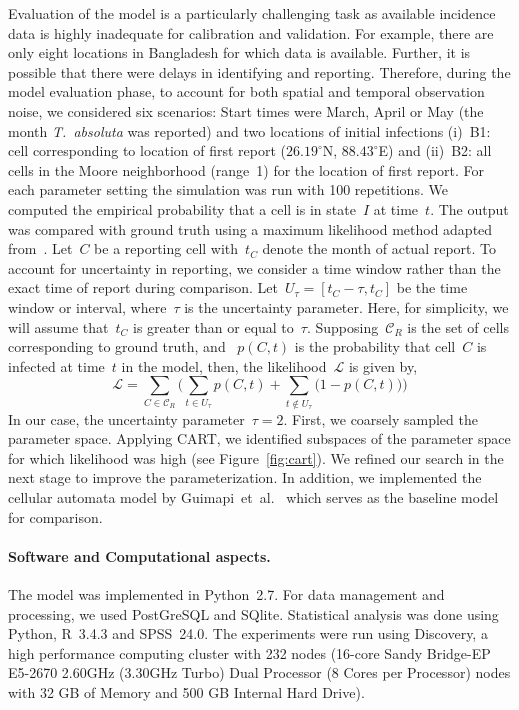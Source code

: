 \documentclass[11pt]{article}
\newcommand{\tuta}{\emph{T.~absoluta}}
\newcommand{\reportingCells}{\mathcal{C}_R}
\newcommand{\likelihood}{\mathcal{L}}
\theoremstyle{definition}
\begin{document}
Evaluation of the model is a particularly challenging task as available
incidence data is highly inadequate for calibration and validation. For
example, there are only eight locations in Bangladesh for which data is
available. Further, it is possible that there were delays in identifying
and reporting.  Therefore, during the model evaluation phase, to account
for both spatial and temporal observation noise, we considered six
scenarios: Start times were March, April or May (the month \tuta{} was
reported) and two locations of initial infections (i)~B1: cell
corresponding to location of first report ($26.19^\circ$N, $88.43^\circ$E)
and (ii)~B2: all cells in the Moore neighborhood (range~1) for the location
of first report.  For each parameter setting the simulation was run with
100 repetitions.  We computed the empirical probability that a cell is in
state~$I$ at time~$t$.  The output was compared with ground truth using a
maximum likelihood method adapted
from~\cite{carrasco2010unveiling,keeling}. Let~$C$ be a reporting cell
with~$t_C$ denote the month of actual report. To account for uncertainty in
reporting, we consider a time window rather than the exact time of report
during comparison. Let~$U_\tau=[t_C-\tau,t_C]$ be the time window or
interval, where~$\tau$ is the uncertainty parameter. Here, for simplicity,
we will assume that~$t_C$ is greater than or equal to~$\tau$.
Supposing~$\reportingCells$ is the set of cells corresponding to ground
truth,  and ~$p(C,t)$ is the probability that cell~$C$ is infected at
time~$t$ in the model, then, the likelihood~$\likelihood$ is given by,
\[
    \likelihood=\sum_{C\in\reportingCells} \Big(\sum_{t\in U_\tau}p(C,t)
    + \sum_{t\notin U_\tau}\big(1-p(C,t)\big) \Big)
\]
In our case, the uncertainty parameter~$\tau=2$.  First, we coarsely
sampled the parameter space. Applying CART, we identified subspaces of the
parameter space for which likelihood was high (see Figure~\ref{fig:cart}).
We refined our search in the next stage to improve the parameterization.
In addition, we implemented the cellular automata model by
Guimapi~et~al.~\cite{guimapi2016modeling} which serves as the baseline
model for comparison.

\paragraph{Software and Computational aspects.} The model was implemented
in Python~2.7. For data management and processing, we used PostGreSQL and
SQlite.  Statistical analysis was done using Python, R~3.4.3 and SPSS~24.0.
The experiments were run using Discovery, a high performance computing
cluster with 232 nodes (16-core Sandy Bridge-EP E5-2670 2.60GHz (3.30GHz
Turbo) Dual Processor (8 Cores per Processor) nodes with 32 GB of Memory
and 500 GB Internal Hard Drive).
\end{document}
